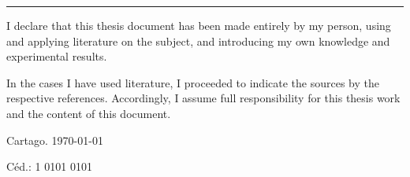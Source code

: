 \thispagestyle{empty}

\rule{10mm}{0pt}

\vfill

I declare that this thesis document has been made ​​entirely by my person, using
and applying literature on the subject, and introducing my own knowledge and
experimental results.



In the cases I have used literature, I proceeded to indicate the
sources by the respective references. Accordingly, I assume full responsibility
for this thesis work and the content of this document.




\vspace*{8mm}

\begin{flushright}
  \scriptAuthor\par
  Cartago. \today\par
  Céd.: 1 0101 0101
\end{flushright}

\cleardoublepage

